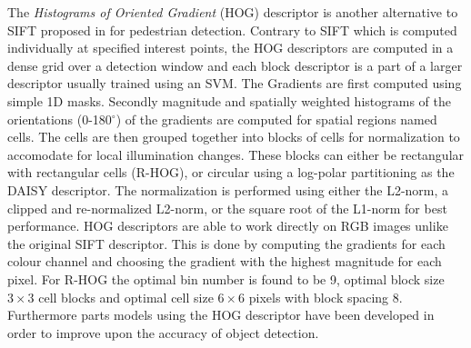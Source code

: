\documentclass[thesis.tex]{subfiles}
\begin{document}
The \emph{Histograms of Oriented Gradient} (HOG) descriptor is another
alternative to SIFT proposed in \cite{dalal2005histograms} for pedestrian
detection. Contrary to SIFT which is computed individually at specified
interest points, the HOG descriptors are computed in a dense grid over a
detection window and each block descriptor is a part of a larger descriptor
usually trained using an SVM. The Gradients are first computed using simple
1D masks. Secondly magnitude and spatially weighted histograms of the
orientations (0-180$^{\circ}$) of the gradients are computed for spatial
regions named cells. The cells are
then grouped together into blocks of cells for normalization to accomodate
for local illumination changes. These blocks can either be rectangular with
rectangular cells (R-HOG), or circular using a log-polar partitioning as the
DAISY descriptor. The normalization is performed using either the L2-norm,
a clipped and re-normalized L2-norm, or the square root of the L1-norm for
best performance. HOG descriptors are able to work directly on RGB images
unlike the original SIFT descriptor. This is done by computing the gradients
for each colour channel and choosing the gradient with the highest magnitude
for each pixel. For R-HOG the optimal bin number is found to be 9, optimal
block size $3\times3$ cell blocks and optimal cell size $6\times6$ pixels
with block spacing 8.
Furthermore parts models using the HOG descriptor have been developed
\cite{felzenszwalb2008discriminatively} in order to improve upon the accuracy
of object detection.

%
%
%
%
%
%
%
%
%

\subbibliography
\end{document}
